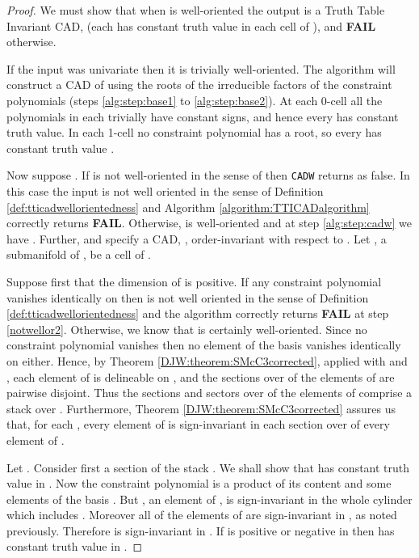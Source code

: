 \documentclass{article}
\begin{document}
\begin{proof}
We must show that when  is well-oriented the output is a Truth Table Invariant CAD, (each  has constant truth value in each cell of ), and \textbf{FAIL} otherwise.

If the input was univariate then it is trivially well-oriented.  The algorithm will construct a CAD  of  using the roots of the irreducible factors of the constraint polynomials (steps \ref{alg:step:base1} to \ref{alg:step:base2}).
At each 0-cell all the polynomials in each  trivially have constant signs, and hence every  has constant truth value.  In each 1-cell no constraint polynomial has a root, so every  has constant truth value .

Now suppose .  
If  is not well-oriented in the sense of \cite{McCallum1998} then \texttt{CADW} returns  as false.  In this case the input  is not well oriented in the sense of Definition \ref{def:tticadwellorientedness} and Algorithm \ref{algorithm:TTICADalgorithm} correctly returns \textbf{FAIL}.  Otherwise,  is well-oriented and at step \ref{alg:step:cadw} we have .  Further,  and  specify a CAD, , order-invariant with respect to .
Let , a submanifold of , be a cell of .

Suppose first that the dimension of  is positive.
If any constraint polynomial  vanishes identically on  then  is not well oriented in the sense of Definition \ref{def:tticadwellorientedness} and the algorithm correctly returns \textbf{FAIL} at step \ref{notwellor2}.  
Otherwise, we know that  is certainly well-oriented.  Since no constraint polynomial  vanishes then no element of the basis  vanishes identically on  either.  Hence, by Theorem \ref{DJW:theorem:SMcC3corrected}, applied with  and , each element of  is delineable on , and the sections over  of the elements of  are pairwise disjoint.
Thus the sections and sectors over  of the elements of  comprise
a stack  over .  Furthermore, Theorem \ref{DJW:theorem:SMcC3corrected} assures us that, for each , every element of  is sign-invariant in each section over  of every element of .

Let . Consider first a section  of the stack .
We shall show that  has constant truth value in .
Now the constraint polynomial  is a product of its content  
and some elements of the basis .
But , an element of ,
is sign-invariant in the whole cylinder  which includes . Moreover all of the elements of  are sign-invariant in , as noted previously. Therefore  is sign-invariant in .
If  is positive or negative in  then
 has constant truth value  in .


\end{proof}
\end{document}

